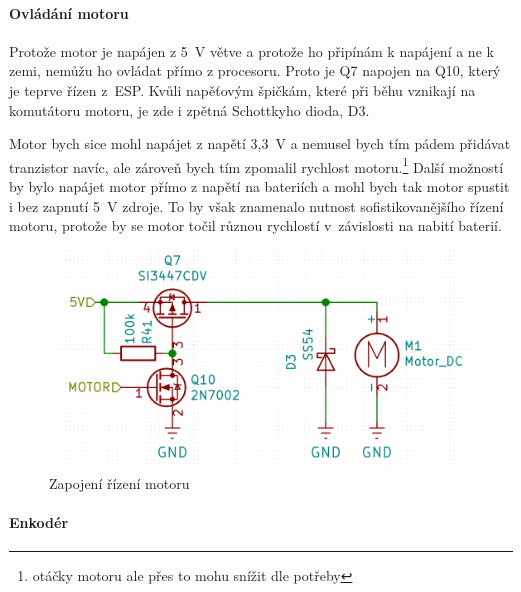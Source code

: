 \paragraph{Ovládání motoru}
Protože motor je napájen z 5~V větve a protože ho připínám k napájení a ne k zemi, nemůžu ho ovládat přímo z procesoru. Proto je Q7 napojen na Q10, který je teprve řízen z~ESP. 
Kvůli napěťovým špičkám, které při běhu vznikají na komutátoru motoru, je zde i zpětná Schottkyho dioda, D3.

Motor bych sice mohl napájet z napětí 3,3~V a nemusel bych tím pádem přidávat tranzistor navíc, ale zároveň bych tím zpomalil rychlost motoru.\footnote{otáčky motoru ale přes to mohu snížit dle potřeby}
Další možností by bylo napájet motor přímo z napětí na bateriích a mohl bych tak motor spustit i bez zapnutí 5~V zdroje. To by však znamenalo nutnost 
sofistikovanějšího řízení motoru, protože by se motor točil různou rychlostí v~závislosti na nabití baterií.

\begin{figure}[htbp]
    \centering
    \includegraphics[width=\textwidth]{kapitoly/obrazky/E4/ir_motor_enkoder/ovladani_motoru.png}
    \caption{Zapojení řízení motoru}
    \label{fig:E4-motor}
\end{figure}

\paragraph{Enkodér}


